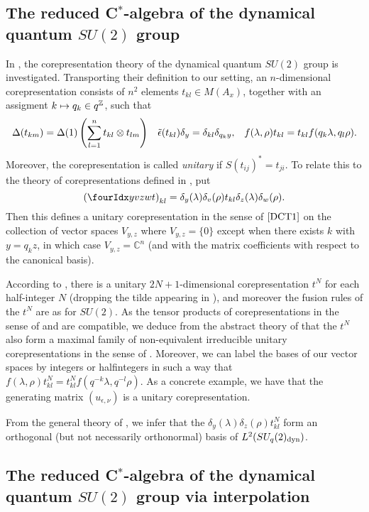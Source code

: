 \subsection{The reduced C$^*$-algebra of the dynamical quantum $SU(2)$ group}

In \cite{KoR1}, the corepresentation theory of the dynamical quantum $SU(2)$ group is investigated. Transporting their definition to our setting, an $n$-dimensional corepresentation consists of $n^2$ elements $t_{kl} \in M(A_x)$, together with an assigment $k \mapsto q_k \in q^{\mathbb{Z}}$, such that \begin{align*} \Delta(t_{km}) = \Delta(1)\left(\sum_{l=1}^n t_{kl}\otimes t_{lm}\right)&& \operatorname{\tilde{\epsilon}}(t_{kl})\delta_y = \delta_{kl} \delta_{q_ky},&& f(\lambda,\rho)t_{kl} = t_{kl}f(q_k\lambda,q_l\rho).\end{align*} Moreover, the corepresentation is called \emph{unitary} if $S(t_{ij})^* =t_{ji}$. To relate this to the theory of corepresentations defined in \cite{DCT1}, put \[\left(\Gr{t}{y}{z}{v}{w}\right)_{kl} = \delta_{y}(\lambda)\delta_v(\rho) t_{kl} \delta_{z}(\lambda)\delta_{w}(\rho).\] Then this defines a unitary corepresentation in the sense of $\cite{DCT1}$ on the collection of vector spaces $V_{y,z}$ where $V_{y,z}=\{0\}$ except when there exists $k$ with $y = q_kz$,  in which case $V_{y,z} = \mathbb{C}^n$ (and with the matrix coefficients with respect to the canonical basis). 

According to \cite{KoR1}, there is a unitary $2N+1$-dimensional corepresentation $t^N$ for each half-integer $N$ (dropping the tilde appearing in \cite{KoR1}), and moreover the fusion rules of the $t^N$ are as for $SU(2)$. As the tensor products of corepresentations in the sense of \cite{KoR1} and \cite{DCT1} are compatible, we deduce from the abstract theory of \cite{DCT1} that the $t^N$ also form a maximal family of non-equivalent irreducible unitary corepresentations in the sense of \cite{DCT1}. Moreover, we can label the bases of our vector spaces by integers or halfintegers in such a way that $f(\lambda,\rho)t_{kl}^N = t_{kl}^Nf(q^{-k}\lambda,q^{-l}\rho)$. As a concrete example, we have that the generating matrix $(u_{\epsilon,\nu})$ is a unitary corepresentation.

From the general theory of \cite{DCT1}, we infer that the $\delta_y(\lambda)\delta_z(\rho)t_{kl}^N$ form an orthogonal (but not necessarily orthonormal) basis of $L^2(SU_q(2)_{\operatorname{\mathrm{dyn}}})$. 




\subsection{The reduced C$^*$-algebra of the dynamical quantum $SU(2)$ group via interpolation}

